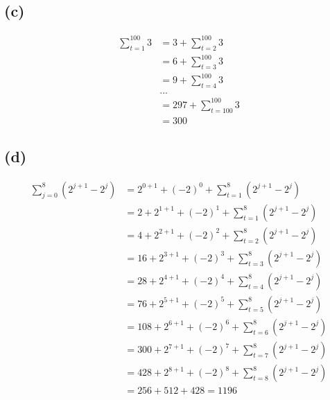 \documentclass{article}
\begin{document}
\subsection*{(c)}
\begin{equation} \label{eq3}
\begin{split}
\sum\limits_{t=1}^{100}3 & =  3 + \sum\limits_{t=2}^{100}3 \\
& = 6 + \sum\limits_{t=3}^{100}3 \\
& = 9 + \sum\limits_{t=4}^{100}3 \\
& ... \\
& = 297 + \sum\limits_{t=100}^{100}3 \\
& = 300 
\end{split}
\end{equation}


\subsection*{(d)}
\begin{equation} \label{eq4}
\begin{split}
\sum\limits_{j=0}^{8}(2^{j+1} - 2^j) & =  2^{0+1} + (-2)^0 + \sum\limits_{t=1}^{8}(2^{j+1} - 2^j) \\
& =  2 + 2^{1+1} + (-2)^1 + \sum\limits_{t=1}^{8}(2^{j+1} - 2^j) \\
& =  4 + 2^{2+1} + (-2)^2 + \sum\limits_{t=2}^{8}(2^{j+1} - 2^j) \\
& =  16 + 2^{3+1} + (-2)^3 + \sum\limits_{t=3}^{8}(2^{j+1} - 2^j) \\
& =  28 + 2^{4+1} + (-2)^4 + \sum\limits_{t=4}^{8}(2^{j+1} - 2^j) \\
& =  76 + 2^{5+1} + (-2)^5 + \sum\limits_{t=5}^{8}(2^{j+1} - 2^j) \\
& =  108 + 2^{6+1} + (-2)^6 + \sum\limits_{t=6}^{8}(2^{j+1} - 2^j) \\
& =  300 + 2^{7+1} + (-2)^7 + \sum\limits_{t=7}^{8}(2^{j+1} - 2^j) \\
& =  428 + 2^{8+1} + (-2)^8 + \sum\limits_{t=8}^{8}(2^{j+1} - 2^j) \\
& =  256+512+428 = 1196
\end{split}
\end{equation}
\end{document}
